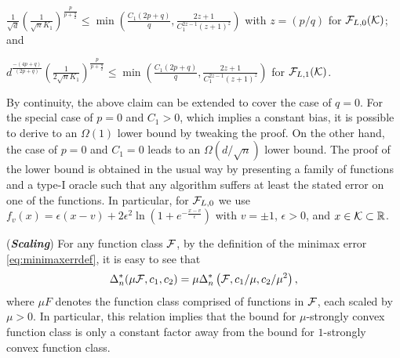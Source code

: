 \begin{inparaenum}[\bfseries (i)]
\item 
$\frac{1}{\sqrt{d}}\left(\frac{1}{\sqrt{n} K_1} \right)^{\frac{p}{p+\frac{q}{2}}}\le \min\left( \frac{C_1 (2p+q)}{q}, \frac{2z+1}{C_1^{2z-1}(z+1)^z}\right)$ with $z=(p/q)$ for $\mathcal{F}_{L,0}(\mathcal{K})$; and\\
\item 
$d^{\frac{-(4p+q)}{(2p+q)}}\left(\frac{1}{2\sqrt{n} K_1} \right)^{\frac{p}{p+\frac{q}{2}}} \le \min\left( \frac{C_1 (2p+q)}{q}, \frac{2z+1}{C_1^{2z-1}(z+1)^z}\right)$  for $\mathcal{F}_{L,1}(\mathcal{K})$.
\end{inparaenum}

By continuity, the above claim can be extended to cover the case of $q=0$. For the special case of $p=0$ and $C_1>0$, which implies a constant bias, it is possible to derive to an $\Omega(1)$ lower bound by tweaking the proof. On the other hand, the case of $p=0$ and $C_1=0$ leads to an $\Omega(d/\sqrt{n})$ lower bound. The proof of the lower bound is obtained in the usual way by presenting a family of functions and a type-I oracle such that any algorithm suffers at least the stated error on one of the functions. In particular, for $\mathcal{F}_{L,0}$ we use
$f_v(x)=\epsilon\left( x-v\right)+2\epsilon^2 \ln\left(1+e^{-\frac{x-v}{\epsilon}}  \right)$ with $v=\pm 1$, $\epsilon>0$, and $x \in \mathcal{K} \subset \mathbb{R}$.


\begin{remark}(\textbf{\textit{Scaling}})
For any function class $\mathcal{F}$, by the definition of the minimax error \eqref{eq:minimaxerrdef}, it is easy to see that
$$\Delta_n^*(\mu \mathcal{F}, c_1,c_2) = \mu \Delta_n^*\left(\mathcal{F}, c_1/\mu,c_2/\mu^2\right),$$
 where $\mu F$ denotes the function class comprised of functions in $\mathcal{F}$, each scaled by $\mu>0$. In particular, this relation implies that the bound for $\mu$-strongly convex function class is only a constant factor away from the bound for $1$-strongly convex function class.
\end{remark}

